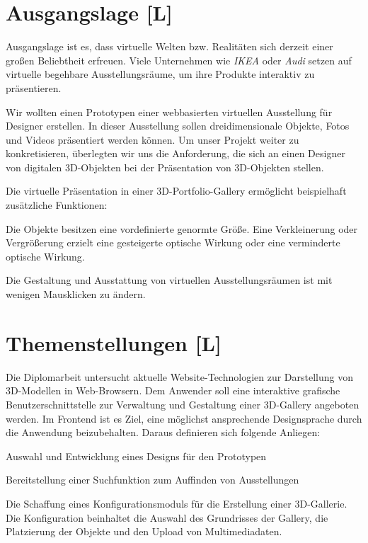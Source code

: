 \section{Ausgangslage [L]}
Ausgangslage ist es, dass virtuelle Welten bzw. Realitäten sich derzeit einer großen Beliebtheit erfreuen. Viele Unternehmen wie \emph{IKEA} oder \emph{Audi} setzen auf virtuelle begehbare Ausstellungsräume, um ihre Produkte interaktiv zu präsentieren. \cite{VrVW}

Wir wollten einen Prototypen einer webbasierten virtuellen Ausstellung für Designer erstellen. In dieser Ausstellung sollen dreidimensionale Objekte, Fotos und Videos präsentiert werden können. Um unser Projekt weiter zu konkretisieren, überlegten wir uns die Anforderung, die sich an einen Designer von digitalen 3D-Objekten bei der Präsentation von 3D-Objekten stellen.

Die virtuelle Präsentation in einer 3D-Portfolio-Gallery ermöglicht beispielhaft zusätzliche Funktionen:
\begin{compactitem}
    \item Die Objekte besitzen eine vordefinierte genormte Größe. Eine Verkleinerung oder Vergrößerung erzielt eine gesteigerte optische Wirkung oder eine verminderte optische Wirkung.
    \item Die Gestaltung und Ausstattung von virtuellen Ausstellungsräumen ist mit wenigen Mausklicken zu ändern.
\end{compactitem}


\section{Themenstellungen [L]}
Die Diplomarbeit untersucht aktuelle Website-Technologien zur Darstellung von 3D-Modellen in Web-Browsern.
Dem Anwender soll eine interaktive grafische Benutzerschnittstelle zur Verwaltung und Gestaltung einer 3D-Gallery angeboten werden.
Im Frontend ist es Ziel, eine möglichst ansprechende Designsprache durch die Anwendung beizubehalten.
Daraus definieren sich folgende Anliegen:
\begin{compactitem}
    \item Auswahl und Entwicklung eines Designs für den Prototypen
    \item Bereitstellung einer Suchfunktion zum Auffinden von Ausstellungen
    \item Die Schaffung eines Konfigurationsmoduls für die Erstellung einer 3D-Gallerie. Die Konfiguration beinhaltet die Auswahl des Grundrisses der Gallery, die Platzierung der Objekte und den Upload von Multimediadaten.
\end{compactitem}


